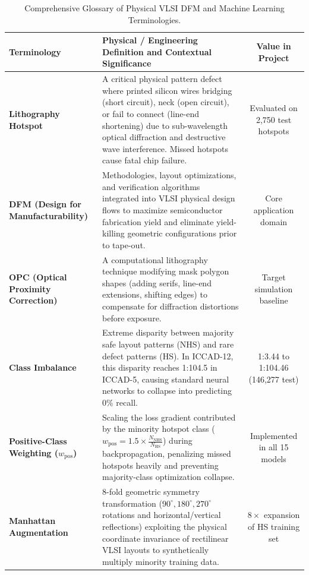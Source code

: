 \documentclass[conference]{IEEEtran}
\begin{document}
\begin{table}[t]
\caption{Comprehensive Glossary of Physical VLSI DFM and Machine Learning Terminologies.}
\label{tab:glossary}
\centering
\small
\begin{tabular}{p{4.2cm}p{10.5cm}c}
\toprule
\textbf{Terminology} & \textbf{Physical / Engineering Definition and Contextual Significance} & \textbf{Value in Project} \\
\midrule
\textbf{Lithography Hotspot} & A critical physical pattern defect where printed silicon wires bridging (short circuit), neck (open circuit), or fail to connect (line-end shortening) due to sub-wavelength optical diffraction and destructive wave interference. Missed hotspots cause fatal chip failure. & Evaluated on 2,750 test hotspots \\
\addlinespace
\textbf{DFM (Design for Manufacturability)} & Methodologies, layout optimizations, and verification algorithms integrated into VLSI physical design flows to maximize semiconductor fabrication yield and eliminate yield-killing geometric configurations prior to tape-out. & Core application domain \\
\addlinespace
\textbf{OPC (Optical Proximity Correction)} & A computational lithography technique modifying mask polygon shapes (adding serifs, line-end extensions, shifting edges) to compensate for diffraction distortions before exposure. & Target simulation baseline \\
\addlinespace
\textbf{Class Imbalance} & Extreme disparity between majority safe layout patterns (NHS) and rare defect patterns (HS). In ICCAD-12, this disparity reaches 1:104.5 in ICCAD-5, causing standard neural networks to collapse into predicting 0\% recall. & 1:3.44 to 1:104.46 (146,277 test) \\
\addlinespace
\textbf{Positive-Class Weighting ($w_{\text{pos}}$)} & Scaling the loss gradient contributed by the minority hotspot class ($w_{\text{pos}} = 1.5 \times \frac{N_{\text{NHS}}}{N_{\text{HS}}}$) during backpropagation, penalizing missed hotspots heavily and preventing majority-class optimization collapse. & Implemented in all 15 models \\
\addlinespace
\textbf{Manhattan Augmentation} & 8-fold geometric symmetry transformation ($90^\circ, 180^\circ, 270^\circ$ rotations and horizontal/vertical reflections) exploiting the physical coordinate invariance of rectilinear VLSI layouts to synthetically multiply minority training data. & $8\times$ expansion of HS training set \\

\end{tabular}
\end{table}
\end{document}
